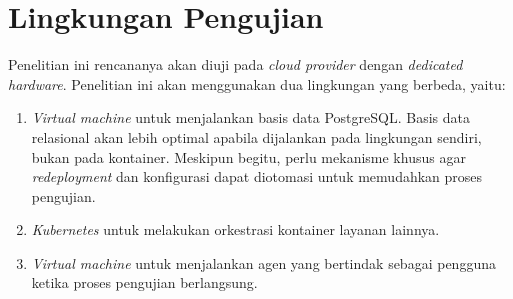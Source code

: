 \section{Lingkungan Pengujian}

Penelitian ini rencananya akan diuji pada \textit{cloud provider} dengan \textit{dedicated hardware}. Penelitian ini akan menggunakan dua lingkungan yang berbeda, yaitu:

\begin{enumerate}
    \item \textit{Virtual machine} untuk menjalankan basis data PostgreSQL. Basis data relasional akan lebih optimal apabila dijalankan pada lingkungan sendiri, bukan pada kontainer. Meskipun begitu, perlu mekanisme khusus agar \textit{redeployment} dan konfigurasi dapat diotomasi untuk memudahkan proses pengujian.
    \item \textit{Kubernetes} untuk melakukan orkestrasi kontainer layanan lainnya.
    \item \textit{Virtual machine} untuk menjalankan agen yang bertindak sebagai pengguna ketika proses pengujian berlangsung.
\end{enumerate}